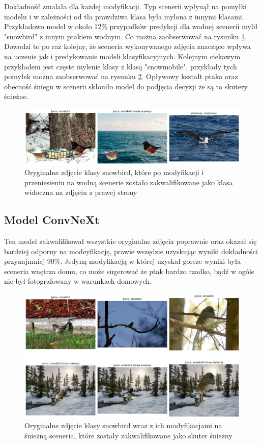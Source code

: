 Dokładność zmalała dla każdej modyfikacji. Typ scenerii wpłynął na pomyłki modelu i w zależności od tła prawdziwa klasa była mylona z innymi klasami. Przykładowo model w około 12\% przypadków predykcji dla wodnej scenerii mylił "snowbird" z innym ptakiem wodnym. 
Co można zaobserwować na rysunku \ref*{rys:13}. Dowodzi to po raz kolejny, że sceneria wykonywanego zdjęcia znacząco wpływa na uczenie jak i predykowanie modeli klasyfikacyjnych. Kolejnym ciekawym przykładem jest częste mylenie klasy z klasą "snowmobile", przykłady tych
pomyłek można zaobserwować na rysunku \ref*{rys:13_2}. Opływowy kształt ptaka oraz obecność śniegu w scenerii skłoniło model do podjęcia decyzji że są to skutery śnieżne.

\begin{figure}
	\centering\includegraphics[width=.9\textwidth]{img/13}
	\caption{Oryginalne zdjęcie klasy snowbird, które po modyfikacji i przeniesieniu na wodną scenerie zostało zakwalifikowane jako klasa widoczna na zdjęciu z prawej strony}
	\label{rys:13}
\end{figure}

\subsection*{Model ConvNeXt}

Ten model zakwalifikował wszystkie oryginalne zdjęcia poprawnie oraz okazał się bardziej odporny na modeyfikację, prawie wszędzie uzyskując wyniki dokładności przynajmniej 90\%. Jedyną modyfikacją w której uzyskał gorsze wyniki była sceneria 
wnętrza domu, co może sugerować że ptak bardzo rzadko, bądź w ogóle nie był fotografowany w warunkach domowych.

\begin{figure}
	\centering\includegraphics[width=.9\textwidth]{img/13_2}
	\caption{Oryginalne zdjęcie klasy snowbird wraz z ich modyfikacjami na śnieżną sceneria, które zostały zakwalifikowane jako skuter śnieżny}
	\label{rys:13_2}
\end{figure}

